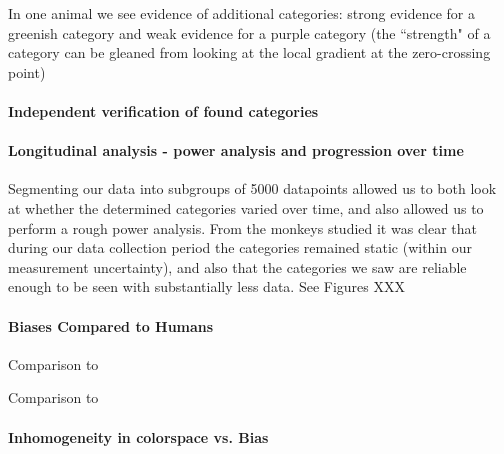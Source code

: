 In one animal we see evidence of additional categories: strong evidence for a greenish category and weak evidence for a purple category (the ``strength" of a category can be gleaned from looking at the local gradient at the zero-crossing point)


\paragraph{Independent verification of found categories}

\paragraph{Longitudinal analysis - power analysis and progression over time}

Segmenting our data into subgroups of 5000 datapoints allowed us to both look at whether the determined categories varied over time, and also allowed us to perform a rough power analysis. From the monkeys studied it was clear that during our data collection period the categories remained static (within our measurement uncertainty), and also that the categories we saw are reliable enough to be seen with substantially less data. See Figures XXX %



\paragraph{Biases Compared to Humans}

Comparison to \cite{bae_why_2015}

Comparison to \cite{panichello_error-correcting_2019}

\paragraph{Inhomogeneity in colorspace vs. Bias}